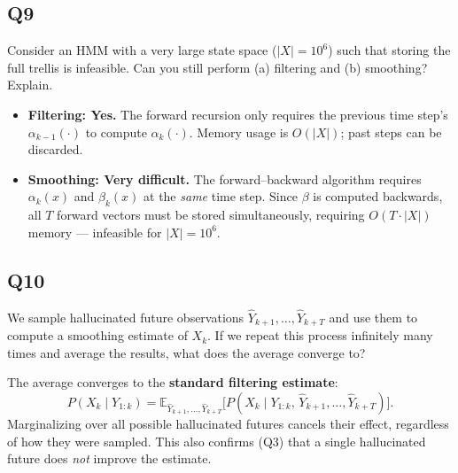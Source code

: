\documentclass[12pt]{article}
\begin{document}
\subsection*{Q9}
\begin{tcolorbox}[questionbox]
Consider an HMM with a very large state space ($|X| = 10^6$) such that storing
the full trellis is infeasible. Can you still perform (a) filtering and
(b) smoothing? Explain.
\end{tcolorbox}

\begin{tcolorbox}[answerbox]
\begin{itemize}
  \item \textbf{Filtering: Yes.} The forward recursion only requires the previous
        time step's $\alpha_{k-1}(\cdot)$ to compute $\alpha_k(\cdot)$. Memory
        usage is $O(|X|)$; past steps can be discarded.
  \item \textbf{Smoothing: Very difficult.} The forward--backward algorithm
        requires $\alpha_k(x)$ and $\beta_k(x)$ at the \emph{same} time step.
        Since $\beta$ is computed backwards, all $T$ forward vectors must be
        stored simultaneously, requiring $O(T \cdot |X|)$ memory --- infeasible
        for $|X| = 10^6$.
\end{itemize}
\end{tcolorbox}

\subsection*{Q10}
\begin{tcolorbox}[questionbox]
We sample hallucinated future observations $\hat{Y}_{k+1}, \ldots, \hat{Y}_{k+T}$
and use them to compute a smoothing estimate of $X_k$. If we repeat this process
infinitely many times and average the results, what does the average converge to?
\end{tcolorbox}

\begin{tcolorbox}[answerbox]
The average converges to the \textbf{standard filtering estimate}:
\[
  P(X_k \mid Y_{1:k})
  = \mathbb{E}_{\hat{Y}_{k+1},\ldots,\hat{Y}_{k+T}}
    \!\Big[P\!\left(X_k \mid Y_{1:k},\,\hat{Y}_{k+1},\ldots,\hat{Y}_{k+T}\right)\Big].
\]
Marginalizing over all possible hallucinated futures cancels their effect,
regardless of how they were sampled. This also confirms (Q3) that a single
hallucinated future does \emph{not} improve the estimate.
\end{tcolorbox}
\end{document}
